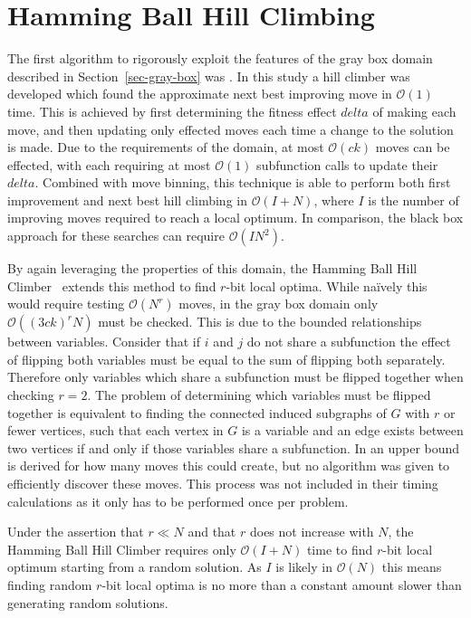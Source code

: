 \documentclass{sig-alternate}
\newcommand{\BigO}[1]{$\mathcal{O}{(#1)}$}
\begin{document}
\section{Hamming Ball Hill Climbing}
\label{sec-hamming}
The first algorithm to rigorously exploit the features of the gray box domain
described in Section~\ref{sec-gray-box} was \cite{whitley:2013:greedy}. In this study
a hill climber was developed which found the approximate next best improving move in \BigO{1} time.
This is achieved by first determining the fitness effect $delta$ of making each move, and then updating
only effected moves each time a change to the solution is made. Due to the requirements of the domain,
at most \BigO{ck} moves can be effected, with each requiring at most \BigO{1} subfunction calls
to update their $delta$. Combined with move binning, this technique is able to perform both
first improvement and next best hill climbing in \BigO{I+N}, where $I$ is the number of improving
moves required to reach a local optimum. In comparison, the black box approach for these searches can require
\BigO{IN^2}.

By again leveraging the properties of this domain, the Hamming Ball Hill Climber~\cite{chicano:2014:ball} extends this
method to find $r$-bit local optima. While na\"ively this would require testing \BigO{N^r} moves, in the gray box domain only
\BigO{(3ck)^rN} must be checked. This is due to the bounded relationships between variables.
Consider that if $i$ and $j$ do not share a subfunction the effect of flipping both variables
must be equal to the sum of flipping both separately. Therefore only variables which share
a subfunction must be flipped together when checking $r=2$. The problem of determining
which variables must be flipped together is equivalent to finding the connected induced
subgraphs of $G$ with $r$ or fewer vertices, such that each vertex in $G$ is a variable
and an edge exists between two vertices if and only if those variables share a subfunction.
In \cite{chicano:2014:ball} an upper bound is derived for how many moves this could create,
but no algorithm was given to efficiently discover these moves. This process was not included
in their timing calculations as it only has to be performed once per problem.

Under the assertion that $r \ll N$ and that $r$ does not increase with $N$, the Hamming
Ball Hill Climber requires only \BigO{I+N} time to find $r$-bit local optimum starting
from a random solution. As $I$ is likely in \BigO{N} this means finding random $r$-bit local optima
is no more than a constant amount slower than generating random solutions.
\end{document}
